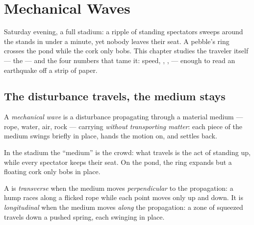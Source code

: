 \chapter{Mechanical Waves}\label{ch:g12:mechanical-waves}

Saturday evening, a full stadium: a ripple of standing spectators
sweeps around the stands in under a minute, yet nobody leaves their
seat. A pebble's ring crosses the pond while the cork only bobs. This
chapter studies the traveler itself --- the  --- and the four
numbers that tame it: speed, , ,  --- enough to
read an earthquake off a strip of paper.

\section{The disturbance travels, the medium stays}

\begin{definition}\label{def:g12:mechanical-waves:wave}
A \emph{mechanical wave} is a disturbance
propagating through a material medium --- rope, water, air, rock ---
carrying  \emph{without transporting matter}: each piece of the
medium swings briefly in place, hands the motion on, and settles back.
\end{definition}

\begin{example}\label{ex:g12:mechanical-waves:transport}
In the stadium  the ``medium'' is the crowd: what travels is the
act of standing up, while every spectator keeps their seat. On the
pond, the ring expands but a floating cork only bobs in place.
\end{example}

\begin{definition}\label{def:g12:mechanical-waves:transverse}
A  is \emph{transverse} when the medium
moves \emph{perpendicular} to the propagation: a hump races along a
flicked rope while each point moves only up and down. It is
\emph{longitudinal} when the medium moves
\emph{along} the propagation: a zone of squeezed  travels down a
pushed spring, each  swinging in place.
\end{definition}


